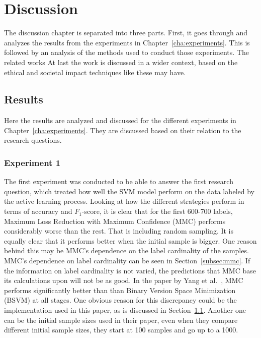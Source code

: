 \chapter{Discussion}
\label{cha:discussion}

The discussion chapter is separated into three parts.
First, it goes through and analyzes the results from the experiments in Chapter~\ref{cha:experiments}.
This is followed by an analysis of the methods used to conduct those experiments.
The related works 
At last the work is discussed in a wider context, based on the ethical and societal impact techniques like these may have.

\section{Results}
\label{sec:discussion-results}

Here the results are analyzed and discussed for the different experiments in Chapter~\ref{cha:experiments}.
They are discussed based on their relation to the research questions.

\subsection{Experiment 1}

The first experiment was conducted to be able to answer the first research question, which treated how well the SVM model perform on the data labeled by the active learning process.
Looking at how the different strategies perform in terms of accuracy and $F_1$-score, it is clear that for the first 600-700 labels, Maximum Loss Reduction with Maximum Confidence (MMC) performs considerably worse than the rest.
That is including random sampling.
It is equally clear that it performs better when the initial sample is bigger.
One reason behind this may be MMC's dependence on the label cardinality of the samples.
MMC's dependence on label cardinality can be seen in Section~\ref{subsec:mmc}.
If the information on label cardinality is not varied, the predictions that MMC base its calculations upon will not be as good.
In the paper by Yang et al\@.~\cite{yang2009effective}, MMC performs significantly better than than Binary Version Space Minimization (BSVM) at all stages.
One obvious reason for this discrepancy could be the implementation used in this paper, as is discussed in Section~\ref{sec:discussion-results}.
Another one can be the initial sample sizes used in their paper, even when they compare different initial sample sizes, they start at 100 samples and go up to a 1000.

